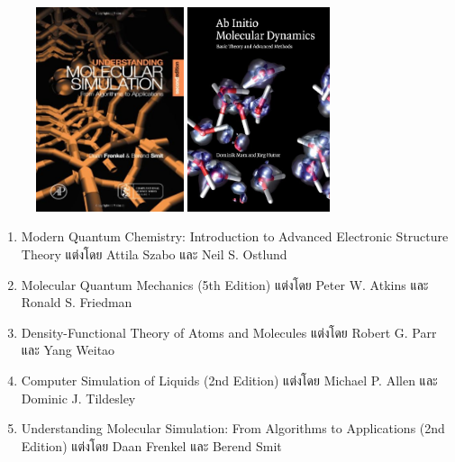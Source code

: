 {\begin{figure}[H]
\begin{center}
        \hspace{0.5em}
        \includegraphics[height=6cm]{fig/understand-mol-sim.jpg}
        \hspace{0.5em}
        \includegraphics[height=6cm]{fig/aimd.jpeg}
    \end{center}
\end{figure}

\begin{enumerate}
    \item Modern Quantum Chemistry: Introduction to Advanced Electronic Structure Theory
    แต่งโดย Attila Szabo และ Neil S. Ostlund\autocite{szabo1996}

    \item Molecular Quantum Mechanics (5th Edition)
    แต่งโดย Peter W. Atkins และ Ronald S. Friedman\autocite{atkins2010}

    \item Density-Functional Theory of Atoms and Molecules 
    แต่งโดย Robert G. Parr และ Yang Weitao\autocite{parr1994}

    \item Computer Simulation of Liquids (2nd Edition)
    แต่งโดย Michael P. Allen และ Dominic J. Tildesley\autocite{allen2017}
    
    \item Understanding Molecular Simulation: From Algorithms to Applications (2nd Edition)
    แต่งโดย Daan Frenkel และ Berend Smit\autocite{frenkel2001}


\end{enumerate}}
